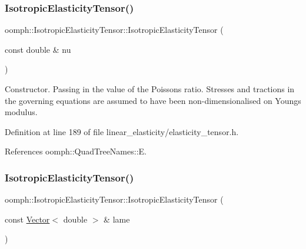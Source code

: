 \subsubsection{\texorpdfstring{Isotropic\+Elasticity\+Tensor()}{IsotropicElasticityTensor()}\hspace{0.1cm}{\footnotesize\ttfamily [2/6]}}
{\footnotesize\ttfamily oomph\+::\+Isotropic\+Elasticity\+Tensor\+::\+Isotropic\+Elasticity\+Tensor (\begin{DoxyParamCaption}\item[{const double \&}]{nu }\end{DoxyParamCaption})\hspace{0.3cm}{\ttfamily [inline]}}



Constructor. Passing in the value of the Poisson\textquotesingle{}s ratio. Stresses and tractions in the governing equations are assumed to have been non-\/dimensionalised on Young\textquotesingle{}s modulus. 



Definition at line 189 of file linear\+\_\+elasticity/elasticity\+\_\+tensor.\+h.



References oomph\+::\+Quad\+Tree\+Names\+::E.

\mbox{\label{classoomph_1_1IsotropicElasticityTensor_a0f4785c975f317f98864f28bb977a516}} 
\subsubsection{\texorpdfstring{Isotropic\+Elasticity\+Tensor()}{IsotropicElasticityTensor()}\hspace{0.1cm}{\footnotesize\ttfamily [3/6]}}
{\footnotesize\ttfamily oomph\+::\+Isotropic\+Elasticity\+Tensor\+::\+Isotropic\+Elasticity\+Tensor (\begin{DoxyParamCaption}\item[{const \hyperlink{classoomph_1_1Vector}{Vector}$<$ double $>$ \&}]{lame }\end{DoxyParamCaption})\hspace{0.3cm}{\ttfamily [inline]}}



